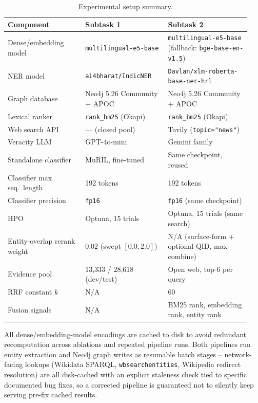 \documentclass[
]{ceurart}
\begin{document}
\begin{table}[h]
  \centering
  \caption{Experimental setup summary.}
  \label{tab:setup}
  \small
  \begin{tabular}{@{}p{0.30\linewidth}p{0.32\linewidth}p{0.32\linewidth}@{}}
    \toprule
    Component & Subtask 1 & Subtask 2 \\
    \midrule
    Dense/embedding model & \texttt{multilingual-e5-base} & \texttt{multilingual-e5-base} (fallback: \texttt{bge-base-en-v1.5}) \\
    NER model & \texttt{ai4bharat/IndicNER} & \texttt{Davlan/xlm-roberta-base-ner-hrl} \\
    Graph database & Neo4j 5.26 Community + APOC & Neo4j 5.26 Community + APOC \\
    Lexical ranker & \texttt{rank\_bm25} (Okapi) & \texttt{rank\_bm25} (Okapi) \\
    Web search API & --- (closed pool) & Tavily (\texttt{topic="news"}) \\
    Veracity LLM & GPT-4o-mini & Gemini family \\
    Standalone classifier & MuRIL, fine-tuned & Same checkpoint, reused \\
    Classifier max seq.\ length & 192 tokens & 192 tokens \\
    Classifier precision & \texttt{fp16} & \texttt{fp16} (same checkpoint) \\
    HPO & Optuna, 15 trials & Optuna, 15 trials (same search) \\
    Entity-overlap rerank weight & 0.02 (swept $[0.0, 2.0]$) & N/A (surface-form + optional QID, max-combine) \\
    Evidence pool & 13{,}333 / 28{,}618 (dev/test) & Open web, top-6 per query \\
    RRF constant $k$ & N/A & 60 \\
    Fusion signals & N/A & BM25 rank, embedding rank, entity rank \\
    \bottomrule
  \end{tabular}
\end{table}

All dense/embedding-model encodings are cached to disk to avoid
redundant recomputation across ablations and repeated pipeline runs.
Both pipelines run entity extraction and Neo4j graph writes as
resumable batch stages -- network-facing lookups (Wikidata SPARQL,
\texttt{wbsearchentities}, Wikipedia redirect resolution) are all
disk-cached with an explicit staleness check tied to specific
documented bug fixes, so a corrected pipeline is guaranteed not to
silently keep serving pre-fix cached results.
\end{document}
